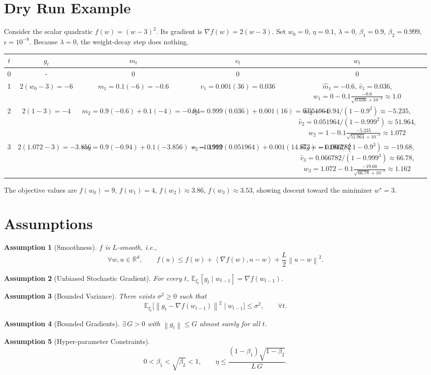 \documentclass{article}
\newtheorem{assumption}{Assumption}
\newcommand{\E}{\mathbb{E}}
\newcommand{\R}{\mathbb{R}}
\newcommand{\norm}[1]{\left\lVert#1\right\rVert}
\newcommand{\ip}[2]{\left\langle #1,#2\right\rangle}
\begin{document}
\section*{Dry Run Example}
Consider the scalar quadratic $f(w)=(w-3)^2$.  
Its gradient is $\nabla f(w)=2(w-3)$.  
Set $w_0=0$, $\eta=0.1$, $\lambda=0$, $\beta_1=0.9$, $\beta_2=0.999$, $\epsilon=10^{-8}$.  
Because $\lambda=0$, the weight‑decay step does nothing.

\begin{center}
\begin{tabular}{c|c|c|c|c}
$t$ & $g_t$ & $m_t$ & $v_t$ & $w_t$ \\ \hline
0 & - & 0 & 0 & $0$\\
1 & $2(w_0-3) = -6$ &
$m_1 = 0.1(-6) = -0.6$ &
$v_1 = 0.001(36)=0.036$ &
$\hat m_1=-0.6$, $\hat v_1=0.036$, 
$w_1 = 0 -0.1\frac{-0.6}{\sqrt{0.036}+10^{-8}}
      \approx 1.0$\\ \hline
2 & $2(1-3)=-4$ &
$m_2 =0.9(-0.6)+0.1(-4) = -0.94$ &
$v_2 =0.999(0.036)+0.001(16)=0.051964$ &
$\hat m_2 = -0.94/(1-0.9^2)\approx -5.235$, 
$\hat v_2 =0.051964/(1-0.999^2)\approx 51.964$,
$w_2 = 1 -0.1\frac{-5.235}{\sqrt{51.964}+10^{-8}}
      \approx 1.072$\\ \hline
3 & $2(1.072-3)=-3.856$ &
$m_3 =0.9(-0.94)+0.1(-3.856) = -1.1912$ &
$v_3 =0.999(0.051964)+0.001(14.873) = 0.066782$ &
$\hat m_3 = -1.1912/(1-0.9^3)\approx -19.68$, 
$\hat v_3 =0.066782/(1-0.999^3)\approx 66.78$,
$w_3 = 1.072 -0.1\frac{-19.68}{\sqrt{66.78}+10^{-8}}
      \approx 1.162$\\
\end{tabular}
\end{center}
The objective values are $f(w_0)=9$, $f(w_1)=4$, $f(w_2)\approx3.86$, $f(w_3)\approx3.53$, showing descent toward the minimizer $w^\star=3$.

\section*{Assumptions}
\begin{assumption}[Smoothness]\label{ass:smooth}
$f$ is $L$‑smooth, i.e.,
\[
\forall w,u\in\R^d,\qquad 
f(u)\le f(w)+\ip{\nabla f(w)}{u-w}+\frac{L}{2}\norm{u-w}^2 .
\]
\end{assumption}
\begin{assumption}[Unbiased Stochastic Gradient]\label{ass:unbiased}
For every $t$, $\E_{\xi_t}[g_t\mid w_{t-1}]=\nabla f(w_{t-1})$.
\end{assumption}
\begin{assumption}[Bounded Variance]\label{ass:variance}
There exists $\sigma^2\ge0$ such that
\[
\E_{\xi_t}\!\big[\norm{g_t-\nabla f(w_{t-1})}^2\mid w_{t-1}\big]\le\sigma^2,\qquad\forall t .
\]
\end{assumption}
\begin{assumption}[Bounded Gradients]\label{ass:bounded}
$\exists\,G>0$ with $\norm{g_t}\le G$ almost surely for all $t$.
\end{assumption}
\begin{assumption}[Hyper‑parameter Constraints]\label{ass:hyper}
\[
0<\beta_1<\sqrt{\beta_2}<1,\qquad 
\eta\le \frac{(1-\beta_1)\sqrt{1-\beta_2}}{L\,G}.
\]
\end{assumption}
\end{document}
